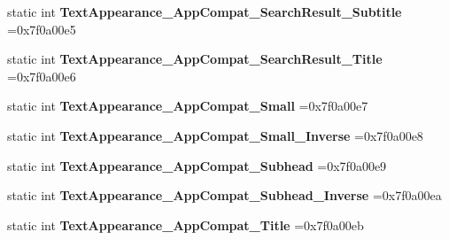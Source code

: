 \begin{DoxyCompactItemize}
static int {\bfseries Text\+Appearance\+\_\+\+App\+Compat\+\_\+\+Search\+Result\+\_\+\+Subtitle} =0x7f0a00e5
\item 
\mbox{\label{classandroid_1_1support_1_1graphics_1_1drawable_1_1animated_1_1R_1_1style_ab4a1f24d31d163647de959e147f83439}} 
static int {\bfseries Text\+Appearance\+\_\+\+App\+Compat\+\_\+\+Search\+Result\+\_\+\+Title} =0x7f0a00e6
\item 
\mbox{\label{classandroid_1_1support_1_1graphics_1_1drawable_1_1animated_1_1R_1_1style_a6ff96d8efb3baaab76d8007db5d37c3d}} 
static int {\bfseries Text\+Appearance\+\_\+\+App\+Compat\+\_\+\+Small} =0x7f0a00e7
\item 
\mbox{\label{classandroid_1_1support_1_1graphics_1_1drawable_1_1animated_1_1R_1_1style_ade492129bf2a5b9319112208b40cce0d}} 
static int {\bfseries Text\+Appearance\+\_\+\+App\+Compat\+\_\+\+Small\+\_\+\+Inverse} =0x7f0a00e8
\item 
\mbox{\label{classandroid_1_1support_1_1graphics_1_1drawable_1_1animated_1_1R_1_1style_ae41d2572876ec537c0d1c64f50bf98f8}} 
static int {\bfseries Text\+Appearance\+\_\+\+App\+Compat\+\_\+\+Subhead} =0x7f0a00e9
\item 
\mbox{\label{classandroid_1_1support_1_1graphics_1_1drawable_1_1animated_1_1R_1_1style_a3cad16c1c7a4cdb28bed404985a8958a}} 
static int {\bfseries Text\+Appearance\+\_\+\+App\+Compat\+\_\+\+Subhead\+\_\+\+Inverse} =0x7f0a00ea
\item 
\mbox{\label{classandroid_1_1support_1_1graphics_1_1drawable_1_1animated_1_1R_1_1style_aea51aa6b2a01e127d7c5e6e16e653346}} 
static int {\bfseries Text\+Appearance\+\_\+\+App\+Compat\+\_\+\+Title} =0x7f0a00eb
\item 
\mbox{\label{classandroid_1_1support_1_1graphics_1_1drawable_1_1animated_1_1R_1_1style_aa6c43373b1835d09be46865c26f39f91}} 

\end{DoxyCompactItemize}
